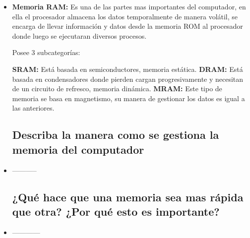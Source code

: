 \begin{itemize}
    \item \textbf{Memoria RAM: } Es una de las partes mas importantes del computador, en ella el procesador almacena los datos temporalmente de manera volátil, se encarga de llevar información y datos desde la memoria ROM al procesador donde luego se ejecutaran diversos procesos.
    
    Posee 3 subcategorías:
    
    \textbf{SRAM:} Está basada en semiconductores, memoria estática. \newline
    \textbf{DRAM:} Está basada en condensadores donde pierden cargan progresivamente y necesitan de un circuito de refresco, memoria dinámica. \newline
    \textbf{MRAM:} Este tipo de memoria se basa en magnetismo, su manera de gestionar los datos es igual a las anteriores. \newline
    
    
    \subsection{ Describa la manera como se gestiona la memoria del computador}
    \item -----------
    
    
    \subsection{ ¿Qué hace que una memoria sea mas rápida que otra? ¿Por qué esto es importante?}
    \item ------------
    
    
\end{itemize}